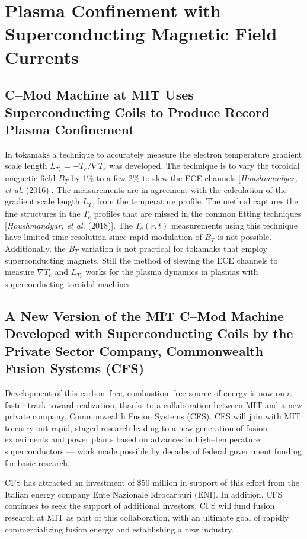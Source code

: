 \documentclass[a4paper,openany,12pt]{report}
\begin{document}
%
\chapter{Plasma Confinement with Superconducting Magnetic Field Currents}

\section{C--Mod Machine at MIT Uses Superconducting Coils to Produce Record Plasma Confinement}
\vspace*{-.2in}

In tokamaks a technique to accurately measure the electron temperature gradient scale length 
$L_{T_e} = -T_e/\nabla T_e$ was developed. The technique is to vary the toroidal magnetic field $B_T$ by 1\% to a few 2\% to slew the ECE channels [\emph{Houshmandyar, et al.} (2016)]. The measurements are in agreement with the calculation of the gradient scale length $L_{T_e}$ from the temperature profile. The method captures the fine structures in the $T_e$ profiles that are missed in the common fitting techniques [\emph{Houshmandyar, et al.} (2018)]. The $T_e(r, t)$ measurements using this technique have limited time resolution since rapid modulation of $B_T$ is not possible. Additionally, the $B_T$ variation is not practical for tokamaks that employ superconducting magnets. Still the method of slewing the ECE channels to measure $\nabla T_e$ and $L_{T_e}$ works for the plasma dynamics in plasmas with superconducting toroidal machines.

\section{A New Version of the MIT C--Mod Machine Developed with Superconducting Coils by the Private Sector Company, Commonwealth Fusion Systems (CFS)}

Development of this carbon--free, combustion--free source of energy is now on a faster track toward realization, thanks to a collaboration between MIT and a new private company, Commonwealth Fusion Systems (CFS). CFS will join with MIT to carry out rapid, staged research leading to a new generation of fusion experiments and power plants based on advances in high--temperature superconductors --- work made possible by decades of federal government funding for basic research.

CFS has attracted an investment of \$50 million in support of this effort from the Italian energy company Ente Nazionale Idrocarburi (ENI). In addition, CFS continues to seek the support of additional investors. CFS will fund fusion research at MIT as part of this collaboration, with an ultimate goal of rapidly commercializing fusion energy and establishing a new industry.
\end{document}
